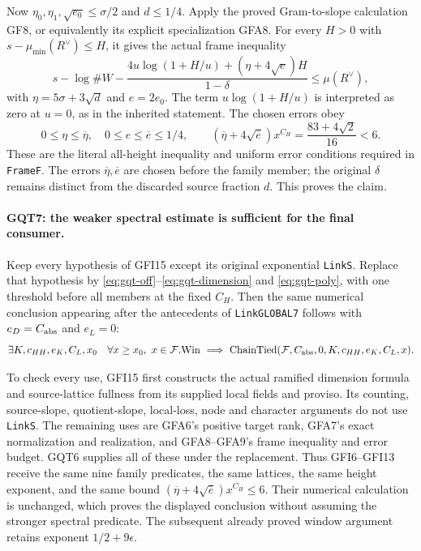 Now $\eta_0,\eta_1,\sqrt{e_0}\le\sigma/2$ and
$d\le1/4$. Apply the proved Gram-to-slope calculation GF8,
or equivalently its explicit specialization GFA8. For every
$H>0$ with $s-\mu_{\min}(R^\vee)\le H$, it gives the actual
frame inequality
\[
 s-\log\#W-
 \frac{4u\log(1+H/u)+(\eta+4\sqrt e)H}{1-\delta}
                         \le\mu(R^\vee),
\]
with $\eta=5\sigma+3\sqrt d$ and $e=2e_0$.
The term $u\log(1+H/u)$ is interpreted as zero at $u=0$,
as in the inherited statement. The chosen errors obey
\[
 0\le\eta\le\overline\eta,\quad
 0\le e\le\overline e\le1/4,
 \qquad
 (\overline\eta+4\sqrt{\overline e})x^{C_H}
       =\frac{83+4\sqrt2}{16}<6.
\]
These are the literal all-height inequality and uniform error
conditions required in \texttt{FrameF}. The errors
$\overline\eta,\overline e$ are chosen before the family member;
the original $\delta$ remains distinct from the discarded source
fraction $d$. This proves the claim.

\paragraph{GQT7: the weaker spectral estimate is sufficient for the final consumer.}
\label{claim:GQT7}
Keep every hypothesis of GFI15 except its original exponential
\texttt{LinkS}. Replace that hypothesis by
\eqref{eq:gqt-off}--\eqref{eq:gqt-dimension} and
\eqref{eq:gqt-poly}, with one threshold before all members at
the fixed $C_H$. Then the same numerical conclusion appearing after
the antecedents of \texttt{LinkGLOBAL7} follows with
$e_D=C_{\rm abs}$ and $e_L=0$:
\[
 \exists K,c_{HH},e_K,C_L,x_0\quad
 \forall x\ge x_0,\ x\in\mathcal F.\mathrm{Win}\ \Longrightarrow\
 \mathrm{ChainTied}(\mathcal F,C_{\rm abs},0,K,c_{HH},e_K,C_L,x).
\]

To check every use, GFI15 first constructs the actual ramified
dimension formula and source-lattice fullness from its supplied
local fields and proviso. Its counting, source-slope,
quotient-slope, local-loss, node and character arguments do not
use \texttt{LinkS}. The remaining uses are GFA6's positive
target rank, GFA7's exact normalization and realization, and
GFA8--GFA9's frame inequality and error budget. GQT6 supplies
all of these under the replacement. Thus GFI6--GFI13 receive
the same nine family predicates, the same lattices, the same
height exponent, and the same bound
$(\overline\eta+4\sqrt{\overline e})x^{C_H}\le6$.
Their numerical calculation is unchanged, which proves the
displayed conclusion without assuming the stronger spectral predicate.
The subsequent already
proved window argument retains exponent $1/2+9\epsilon$.


